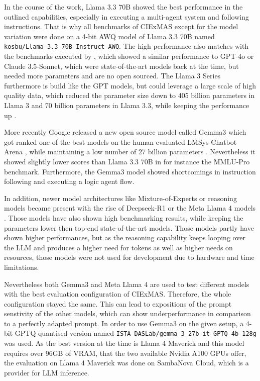 \documentclass[a4paper,oneside,bibliography=totoc]{scrbook}
\begin{document}
In the course of the work, Llama 3.3 70B showed the best performance in the outlined capabilities, especially in executing a multi-agent system and following instructions. That is why all benchmarks of CIExMAS except for the model variation were done on a 4-bit AWQ model of Llama 3.3 70B named \texttt{kosbu/Llama-3.3-70B-Instruct-AWQ}. The high performance also matches with the benchmarks executed by \citet{Meta2024}, which showed a similar performance to GPT-4o or Claude 3.5-Sonnet, which were state-of-the-art models back at the time, but needed more parameters and are no open sourced. The Llama 3 Series furthermore is build like the GPT models, but could leverage a large scale of high quality data, which reduced the parameter size down to 405 billion parameters in Llama 3 and 70 billion parameters in Llama 3.3, while keeping the performance up \cite{Grattafiori2024,Meta2024}.

More recently Google released a new open source model called Gemma3 which got ranked one of the best models on the human-evaluated LMSys Chatbot Arena \cite{Chiang2024}, while maintaining a low number of 27 billion parameters \cite{Team2025}. Nevertheless it showed slightly lower scores than Llama 3.3 70B in for instance the MMLU-Pro benchmark. Furthermore, the Gemma3 model showed shortcomings in instruction following and executing a logic agent flow.

In addition, newer model architectures like Mixture-of-Experts or reasoning models became present with the rise of Deepseek-R1 or the Meta Llama 4 models \cite{DeepSeekAI2025,MetaAI2025}. Those models have also shown high benchmarking results, while keeping the parameters lower then top-end state-of-the-art models. Those models partly have shown higher performances, but as the reasoning capability keeps looping over the LLM and produces a higher need for tokens as well as higher needs on resources, those models were not used for development due to hardware and time limitations.

Nevertheless both Gemma3 and Meta Llama 4 are used to test different models with the best evaluation configuration of CIExMAS. Therefore, the whole configuration stayed the same. This can lead to expositions of the prompt senstivity of the other models, which can show underperformance in comparison to a perfectly adapted prompt. In order to use Gemma3 on the given setup, a 4-bit GPTQ-quantised version named \texttt{ISTA-DASLab/gemma-3-27b-it-GPTQ-4b-128g} was used. As the best version at the time is Llama 4 Maverick and this model requires over 96GB of VRAM, that the two available Nvidia A100 GPUs offer, the evaluation on Llama 4 Maverick was done on SambaNova Cloud, which is a provider for LLM inference.
\end{document}
